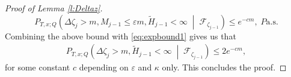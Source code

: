 \documentclass[a4paper]{amsart}
\newtheorem{lemma}{Lemma}
\newcommand{\hitfetak}{\widetilde{H}}
\begin{document}
\begin{proof}[Proof of Lemma \ref{l:Deltaz}]
    \begin{equation}\label{eq:expbound2}
        P_{T,x;Q}\left(\Delta \zeta_j > m, M_{j-1} \le \varepsilon m, \hitfetak_{j-1} < \infty \; \middle | \; \mathcal{F}_{\zeta_{j-1}}\right ) \le e^{-cm}, \; P\text{a.s.}
    \end{equation}
    Combining the above bound with \eqref{eq:expbound1} gives us that 
    \begin{equation*}
    \begin{split}
        P_{T,x;Q}\left(\Delta \zeta_j > m, \hitfetak_{j-1} < \infty \; \middle | \; \mathcal{F}_{\zeta_{j-1}}\right ) \le 2e^{-cm},
    \end{split}
\end{equation*}
for some constant $c$ depending on $\varepsilon$ and $\kappa$ only. This concludes the proof.
\end{proof}



\end{document}
